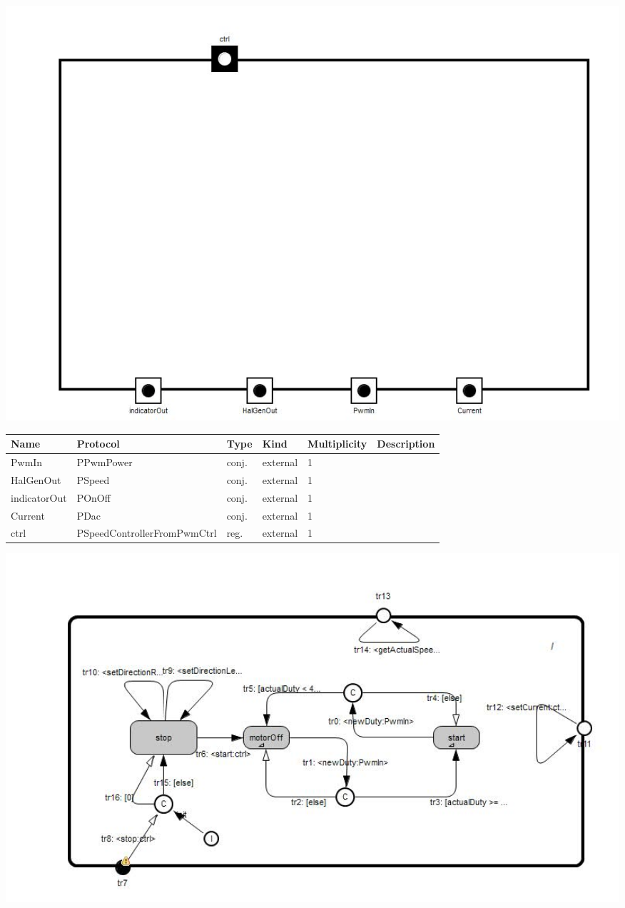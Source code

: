 
{
\centering{}
\includegraphics[width=1.0\textwidth]{./images/ASpeedControllerFromPwm_structure.jpg}
}

\begin{tabular}[ht]{|l|l|l|l|l|p{5cm}|}
\hline
\textbf{Name} & \textbf{Protocol} & \textbf{Type} & \textbf{Kind} & \textbf{Multiplicity} & \textbf{Description}\\
\hline
PwmIn & PPwmPower & conj. & external & 1 & \\
\hline
HalGenOut & PSpeed & conj. & external & 1 & \\
\hline
indicatorOut & POnOff & conj. & external & 1 & \\
\hline
Current & PDac & conj. & external & 1 & \\
\hline
ctrl & PSpeedControllerFromPwmCtrl & reg. & external & 1 & \\
\hline
\end{tabular}

{
\centering{}
\includegraphics[width=1.0\textwidth]{./images/ASpeedControllerFromPwm_behavior.jpg}
}

